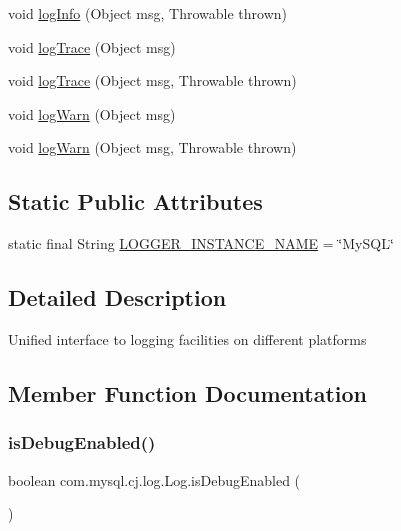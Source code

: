 \begin{DoxyCompactItemize}
void \mbox{\hyperlink{interfacecom_1_1mysql_1_1cj_1_1log_1_1_log_abad2a5a44ff04b24bf46a58997e4f7da}{log\+Info}} (Object msg, Throwable thrown)
\item 
void \mbox{\hyperlink{interfacecom_1_1mysql_1_1cj_1_1log_1_1_log_a04f51d4b9464df28c94695ae8159440e}{log\+Trace}} (Object msg)
\item 
void \mbox{\hyperlink{interfacecom_1_1mysql_1_1cj_1_1log_1_1_log_aa93fa5550a3152afd64479adca676200}{log\+Trace}} (Object msg, Throwable thrown)
\item 
void \mbox{\hyperlink{interfacecom_1_1mysql_1_1cj_1_1log_1_1_log_a3a30dcfb7f5790b79e9db64431107cfc}{log\+Warn}} (Object msg)
\item 
void \mbox{\hyperlink{interfacecom_1_1mysql_1_1cj_1_1log_1_1_log_a36af866ddfdda47938c768d3d0e68572}{log\+Warn}} (Object msg, Throwable thrown)
\end{DoxyCompactItemize}
\subsection*{Static Public Attributes}
\begin{DoxyCompactItemize}
\item 
static final String \mbox{\hyperlink{interfacecom_1_1mysql_1_1cj_1_1log_1_1_log_aa34677968e5974954c41aaa7f5c6ddec}{L\+O\+G\+G\+E\+R\+\_\+\+I\+N\+S\+T\+A\+N\+C\+E\+\_\+\+N\+A\+ME}} = \char`\"{}My\+S\+QL\char`\"{}
\end{DoxyCompactItemize}


\subsection{Detailed Description}
Unified interface to logging facilities on different platforms 

\subsection{Member Function Documentation}
\mbox{\label{interfacecom_1_1mysql_1_1cj_1_1log_1_1_log_a8340f13152932af117ec2f5884c06dd3}} 
\subsubsection{\texorpdfstring{is\+Debug\+Enabled()}{isDebugEnabled()}}
{\footnotesize\ttfamily boolean com.\+mysql.\+cj.\+log.\+Log.\+is\+Debug\+Enabled (\begin{DoxyParamCaption}{ }\end{DoxyParamCaption})}

